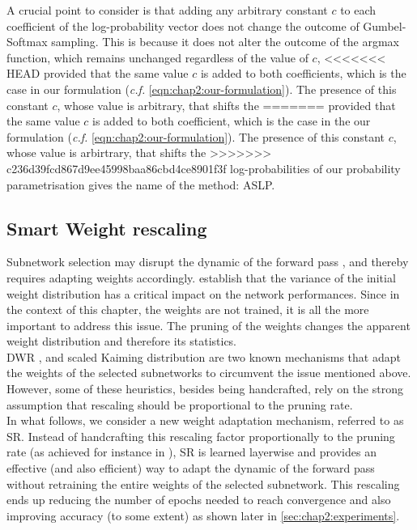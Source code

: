 A crucial point to consider is that adding any arbitrary constant $c$ to each
coefficient of the log-probability vector does not change the outcome of
Gumbel-Softmax sampling. This is because it does not alter the outcome of the
argmax function, which remains unchanged regardless of the value of $c$,
<<<<<<< HEAD
provided that the same value $c$ is added to both coefficients, which is the case
in our formulation (\emph{c.f.} \cref{eqn:chap2:our-formulation}). The
presence of this constant $c$, whose value is arbitrary, that shifts the
=======
provided that the same value $c$ is added to both coefficient, which is the case
in the our formulation (\emph{c.f.} \cref{eqn:chap2:our-formulation}). The
presence of this constant $c$, whose value is arbirtrary, that shifts the
>>>>>>> c236d39fcd867d9ee45998baa86cbd4ce8901f3f
log-probabilities of our probability parametrisation gives the name of the
method: \acl{ASLP}.\\ 



\subsection{Smart Weight rescaling}
\label{sec:smart-rescale}
Subnetwork selection may disrupt the dynamic of the forward pass
\cite{DBLP:conf/iccv/HeZRS15,DBLP:conf/cvpr/RamanujanWKFR20}, and thereby
requires adapting weights accordingly. \cite{DBLP:conf/iccv/HeZRS15} establish
that the variance of the initial weight distribution has a critical impact on
the network performances. Since in the context of this chapter, the weights are
not trained, it is all the more important to address this issue. The pruning of
the weights changes the apparent weight distribution and therefore its
statistics.\\

\ac{DWR} \cite{DBLP:conf/nips/ZhouLLY19}, and scaled Kaiming distribution
\cite{DBLP:conf/cvpr/RamanujanWKFR20} are two known mechanisms that adapt the
weights of the selected subnetworks to circumvent the issue mentioned above.
However, some of these heuristics, besides being handcrafted, rely on the
strong assumption that rescaling should be proportional to the pruning rate.\\

In what follows, we consider a new weight adaptation mechanism, referred to as
\ac{SR}. Instead of handcrafting this rescaling factor proportionally
to the pruning rate (as achieved for instance in
\cite{DBLP:conf/nips/ZhouLLY19}), \ac{SR} is learned layerwise and provides an
effective (and also efficient) way to adapt the dynamic of the forward pass
without retraining the entire weights of the selected subnetwork. This
rescaling ends up reducing the number of epochs needed to reach convergence and
also improving accuracy (to some extent) as shown later in \cref{sec:chap2:experiments}. \\

